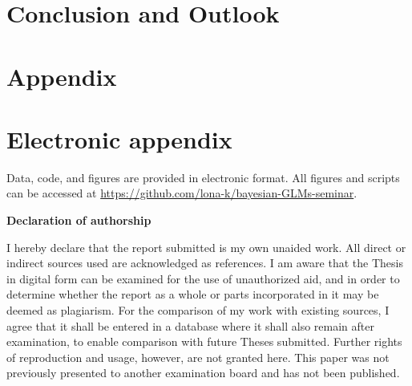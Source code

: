\documentclass[12pt]{article}
\begin{document}
\section{Conclusion and Outlook}
\label{sec:conclusion}


\newpage



\setcounter{page}{5} %

\appendix

\section{Appendix}
\label{sec:app}

\newpage

\section{Electronic appendix}
\label{sec:el_app}

Data, code, and figures are provided in electronic format. All figures and scripts can be accessed at \url{https://github.com/lona-k/bayesian-GLMs-seminar}.

\newpage


\RaggedRight


\newpage


\Large
\noindent
\textbf{Declaration of authorship}
\vspace{0.5cm}
\noindent
\normalsize

I hereby declare that the report submitted is my own unaided work. All direct
or indirect sources used are acknowledged as references. I am aware that the
Thesis in digital form can be examined for the use of unauthorized aid, and in
order to determine whether the report as a whole or parts incorporated in it may
be deemed as plagiarism. For the comparison of my work with existing sources, I
agree that it shall be entered in a database where it shall also remain after
examination, to enable comparison with future Theses submitted. Further rights
of reproduction and usage, however, are not granted here. This paper was not
previously presented to another examination board and has not been published.
\\
\end{document}
